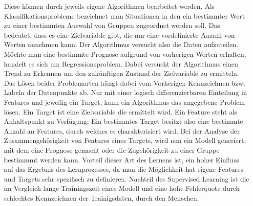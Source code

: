 \documentclass[12pt,german,ngerman]{report}
\begin{document}
            Diese können durch jeweils eigene Algorithmen bearbeitet werden.
            Als Klassifikationsprobleme bezeichnet man Situationen in den ein bestimmter Wert zu einer
            bestimmten Auswahl von Gruppen zugeordnet werden soll. Das bedeutet, dass es eine Zielvariable gibt, die
            nur eine vordefinierte Anzahl von Werten annehmen kann.\cite{kibuisness2021supervised}
            Der Algorithmus versucht also die Daten aufzuteilen.
            Möchte man eine bestimmte Prognose aufgrund von vorherigen Werten erhalten,
            handelt es sich um Regressionsproblem.\cite{kibuisness2021supervised}
            Dabei versucht der Algorithmus einen Trend zu Erkennen um den zukünftigen Zustand der Zielvariable zu ermitteln. 
            Das Lösen beider Problemarten hängt dabei vom Vorherigen Kennzeichnen bzw. Labeln der Datenpunkte ab.
            Nur mit einer logisch differenzierbaren Einteilung in Features und jeweilig ein Target, 
            kann ein Algorithmus das angegebene Problem lösen.
            Ein Target ist eine Zielvariable die ermittelt wird. 
            Ein Feature steht als Anhaltspunkt zu Verfügung.
            Ein bestimmtes Target
            besitzt also eine bestimmte Anzahl an Features, durch welches es charakterisiert wird.
            Bei der Analyse der Zusammengehörigkeit von Features eines Targets, wird nun ein Modell
            generiert, mit dem eine Prognose gemacht oder die Zugehörigkeit zu einer Gruppe bestimmmt werden kann.
            Vorteil dieser Art des Lernens ist, ein hoher Einfluss auf das Ergebnis des Lernprozesses,
            da man die Möglichkeit hat eigene Features und Targets sehr spezifisch zu definieren.
            Nachteil des Supervised Learning ist die im Vergleich lange Trainingszeit eines Modell
            und eine hohe Fehlerquote durch schlechtes Kennzeichnen der Trainigsdaten, durch den Menschen.
            
           
        
\end{document}
